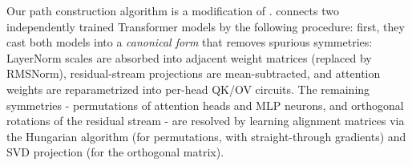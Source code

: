 \documentclass{article}
\begin{document}
Our path construction algorithm is a modification of \cite{theus2025generalizedlinearmodeconnectivity}. \cite{theus2025generalizedlinearmodeconnectivity} connects two independently trained Transformer models by the following procedure: first, they cast both models into a \emph{canonical form} that removes spurious symmetries: LayerNorm scales are absorbed into adjacent weight matrices (replaced by RMSNorm), residual-stream projections are mean-subtracted, and attention weights are reparametrized into per-head QK/OV circuits. The remaining symmetries - permutations of attention heads and MLP neurons, and orthogonal rotations of the residual stream - are resolved by learning alignment matrices via the Hungarian algorithm (for permutations, with straight-through gradients) and SVD projection (for the orthogonal matrix).
\end{document}
